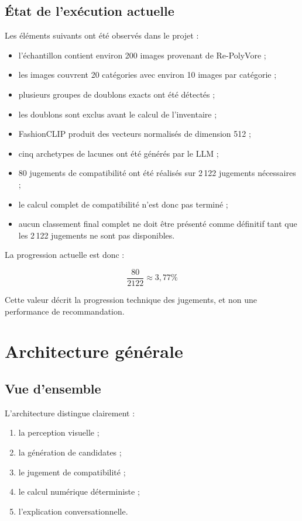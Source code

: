 \documentclass[11pt,a4paper]{article}
\begin{document}
\subsection{État de l'exécution actuelle}

Les éléments suivants ont été observés dans le projet :

\begin{itemize}[leftmargin=*]
    \item l'échantillon contient environ 200 images provenant de
    Re-PolyVore ;
    \item les images couvrent 20 catégories avec environ 10 images par
    catégorie ;
    \item plusieurs groupes de doublons exacts ont été détectés ;
    \item les doublons sont exclus avant le calcul de l'inventaire ;
    \item FashionCLIP produit des vecteurs normalisés de dimension 512 ;
    \item cinq archetypes de lacunes ont été générés par le LLM ;
    \item 80 jugements de compatibilité ont été réalisés sur 2\,122 jugements
    nécessaires ;
    \item le calcul complet de compatibilité n'est donc pas terminé ;
    \item aucun classement final complet ne doit être présenté comme définitif
    tant que les 2\,122 jugements ne sont pas disponibles.
\end{itemize}

La progression actuelle est donc :

\[
\frac{80}{2122}\approx 3{,}77\%
\]

Cette valeur décrit la progression technique des jugements, et non une
performance de recommandation.

\section{Architecture générale}

\subsection{Vue d'ensemble}

L'architecture distingue clairement :

\begin{enumerate}[leftmargin=*]
    \item la perception visuelle ;
    \item la génération de candidates ;
    \item le jugement de compatibilité ;
    \item le calcul numérique déterministe ;
    \item l'explication conversationnelle.
\end{enumerate}
\end{document}
